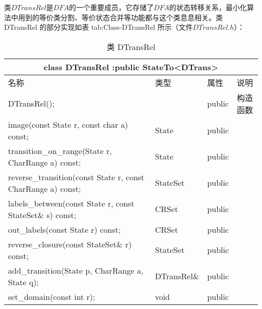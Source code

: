 类$DTransRel$是$DFA$的一个重要成员，它存储了$DFA$的状态转移关系，最小化算法中用到的等价类分割、等价状态合并等功能都与这个类息息相关。类 DTransRel 的部分实现如表 tab:Class-DTransRel 所示（文件$DTransRel.h$）：

\begin{table}[!htbp]
    \caption{类 DTransRel}
    \label{tab:Class-DTransRel}
    \centering
    \small%
    \setlength{\tabcolsep}{4pt}%
    \renewcommand{\arraystretch}{1.2}%
        \begin{tabular}{llll} %
        \toprule 
         \multicolumn{4}{c}{class DTransRel :public StateTo<DTrans>} \\
        \midrule
        名称& 类型 & 属性  &\mbox{说明} \\
        \midrule 
        DTransRel(); &  &  public & 构造函数 \\
        image(const State r, const char a) const; & State & public & \\
        transition\_on\_range(State r, CharRange a) const; & State & public & \\
        reverse\_transition(const State r, const CharRange a) const; & StateSet & public & \\
        labels\_between(const State r, const StateSet\& s) const; & CRSet & public & \\
        out\_labels(const State r) const; & CRSet & public & \\
        reverse\_closure(const StateSet\& r) const; & StateSet & public & \\
        add\_transition(State p, CharRange a, State q); & DTransRel\& & public & \\
        set\_domain(const int r); & void & public & \\
        \bottomrule 
    \end{tabular}
\end{table}

